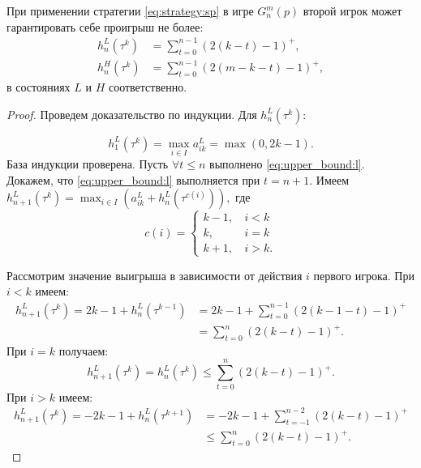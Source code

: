 \begin{utver}
При применении стратегии \eqref{eq:strategy:sp} в игре $ G_n^m(p) $ второй игрок может гарантировать себе проигрыш не более:
\begin{align}
\label{eq:upper_bound:l}
h_n^L(\tau^k) &= \sum_{t=0}^{n-1}
    (2(k - t) - 1)^+,\\
\label{eq:upper_bound:h}
h_n^H(\tau^k) &= \sum_{t=0}^{n-1}
    (2(m - k - t) - 1)^+,
\end{align}
в состояниях $ L $ и $ H $ соответственно.
\end{utver}
\begin{proof}
Проведем доказательство по индукции.
Для $ h_n^L(\tau^k) $:

\[ 
h_1^L(\tau^k) = \max_{i \in I} a_{ik}^L = \max(0, 2k - 1).
\]
База индукции проверена.
Пусть $ \forall t \leq n $ выполнено \eqref{eq:upper_bound:l}. 
Докажем, что \eqref{eq:upper_bound:l} выполняется при $ t=n+1 $. Имеем
$
h_{n+1}^L(\tau^k) = \max_{i \in I} (a_{ik}^L + h_n^L(\tau^{c(i)})),
$
где
\[ 
c(i) = \begin{cases}
    k - 1, &\, i < k \\
    k, &\, i = k \\
    k + 1, &\, i > k.
\end{cases}
\]

Рассмотрим значение выигрыша в зависимости от действия $ i $ первого игрока. 
При $ i < k $ имеем:
\begin{align*}
  h_{n+1}^L(\tau^k) = 2k - 1 + h_n^L(\tau^{k-1}) &= 2k - 1 + \sum_{t = 0}^{n-1} (2(k-1-t)-1)^+ \\
  &= \sum_{t = 0}^n (2(k-t) - 1)^+.
\end{align*}
При $ i = k $ получаем:
\[
  h_{n+1}^L(\tau^k) = h_n^L(\tau^k) \leq \sum_{t=0}^n(2(k-t)-1)^+.
\]
При $ i > k $ имеем:
\begin{align*}
  h_{n+1}^L(\tau^k) = -2k - 1 + h_n^L(\tau^{k+1}) &= -2k - 1 + \sum_{t = -1}^{n-2} (2(k-t)-1)^+ \\
  &\leq \sum_{t=0}^n(2(k-t)-1)^+.
\end{align*}


\end{proof}
